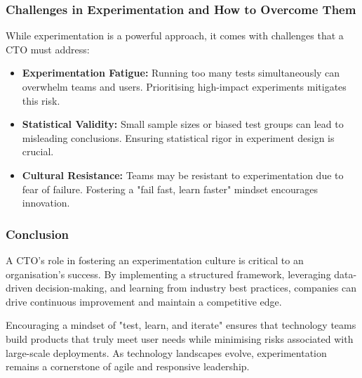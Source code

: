 \subsubsection{Challenges in Experimentation and How to Overcome Them}
While experimentation is a powerful approach, it comes with challenges that a CTO must address:

\begin{itemize}
    \item \textbf{Experimentation Fatigue:} Running too many tests simultaneously can overwhelm teams and users. Prioritising high-impact experiments mitigates this risk.
    \item \textbf{Statistical Validity:} Small sample sizes or biased test groups can lead to misleading conclusions. Ensuring statistical rigor in experiment design is crucial.
    \item \textbf{Cultural Resistance:} Teams may be resistant to experimentation due to fear of failure. Fostering a "fail fast, learn faster" mindset encourages innovation.
\end{itemize}

\subsubsection{Conclusion}
A CTO’s role in fostering an experimentation culture is critical to an organisation’s success. By implementing a structured framework, leveraging data-driven decision-making, and learning from industry best practices, companies can drive continuous improvement and maintain a competitive edge.

Encouraging a mindset of "test, learn, and iterate" ensures that technology teams build products that truly meet user needs while minimising risks associated with large-scale deployments. As technology landscapes evolve, experimentation remains a cornerstone of agile and responsive leadership.

